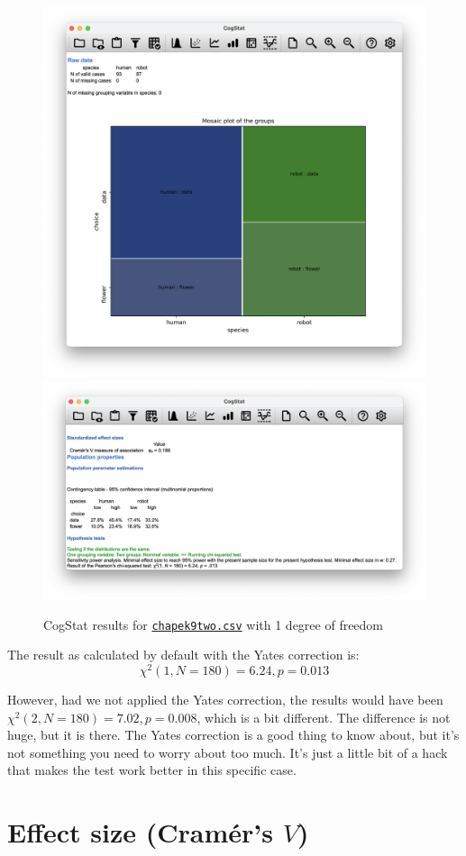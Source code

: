 \documentclass[
]{book}
\theoremstyle{definition}
\theoremstyle{definition}
\theoremstyle{definition}
\theoremstyle{definition}
\theoremstyle{remark}
\begin{document}
\begin{figure}

{\centering \includegraphics[width=0.66\linewidth]{resources/image/cogstatchapek9twomatrix} \includegraphics[width=0.66\linewidth]{resources/image/cogstatchapek9tworesult} 

}

\caption{CogStat results for \href{resources/data/chapek9two.csv}{\texttt{chapek9two.csv}} with 1 degree of freedom}\label{fig:chapek9two}
\end{figure}

The result as calculated by default with the Yates correction is:
\[
\chi^2(1, N = 180) = 6.24, p = 0.013
\]

However, had we not applied the Yates correction, the results would have been \(\chi^2(2, N = 180) = 7.02, p = 0.008\), which is a bit different. The difference is not huge, but it is there. The Yates correction is a good thing to know about, but it's not something you need to worry about too much. It's just a little bit of a hack that makes the test work better in this specific case.

\hypertarget{chisqeffectsize}{%
\section{\texorpdfstring{Effect size (Cramér's \(V\))}{Effect size (Cramér's V)}}\label{chisqeffectsize}}
\end{document}
